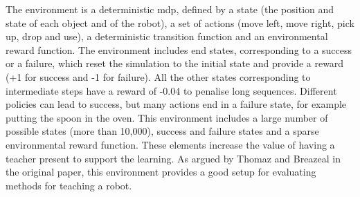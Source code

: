 The environment is a deterministic \gls{mdp}, defined by a state (the position and state of each object and of the robot), a set of actions (move left, move right, pick up, drop and use), a deterministic transition function and an environmental reward function. The environment includes end states, corresponding to a success or a failure, which reset the simulation to the initial state and provide a reward (+1 for success and -1 for failure). All the other states corresponding to intermediate steps have a reward of -0.04 to penalise long sequences. Different policies can lead to success, but many actions end in a failure state, for example putting the spoon in the oven. This environment includes a large number of possible states (more than 10,000), success and failure states and a sparse environmental reward function. These elements increase the value of having a teacher present to support the learning. As argued by Thomaz and Breazeal in the original paper, this environment provides a good setup for evaluating methods for teaching a robot.

